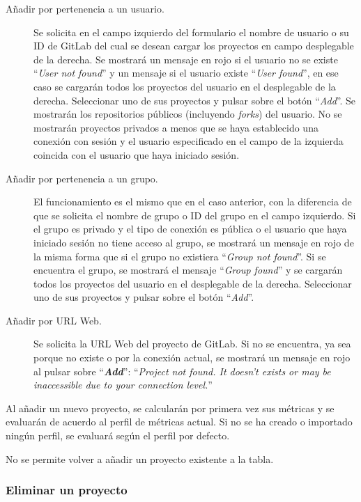 \begin{description}
	\item[Añadir por pertenencia a un usuario.] Se solicita en el campo izquierdo del formulario el nombre de usuario o su ID de GitLab del cual se desean cargar los proyectos en campo desplegable de la derecha. Se mostrará un mensaje en rojo si el usuario no se existe ``\textit{User not found}'' y un mensaje si el usuario existe ``\textit{User found}'', en ese caso se cargarán todos los proyectos del usuario en el desplegable de la derecha. Seleccionar uno de sus proyectos y pulsar sobre el botón ``\textit{Add}''. Se mostrarán los repositorios públicos (incluyendo \textit{forks}) del usuario. No se mostrarán proyectos privados a menos que se haya establecido una conexión con sesión y el usuario especificado en el campo de la izquierda coincida con el usuario que haya iniciado sesión.
	\item[Añadir por pertenencia a un grupo.] El funcionamiento es el mismo que en el caso anterior, con la diferencia de que se solicita el nombre de grupo o ID del grupo en el campo izquierdo. Si el grupo es privado y el tipo de conexión es pública o el usuario que haya iniciado sesión no tiene acceso al grupo, se mostrará un mensaje en rojo de la misma forma que si el grupo no existiera ``\textit{Group not found}''. Si se encuentra el grupo, se mostrará el mensaje ``\textit{Group found}'' y se cargarán todos los proyectos del usuario en el desplegable de la derecha. Seleccionar uno de sus proyectos y pulsar sobre el botón ``\textit{Add}''.
	\item[Añadir por URL Web.] Se solicita la URL Web del proyecto de GitLab. Si no se encuentra, ya sea porque no existe o por la conexión actual, se mostrará un mensaje en rojo al pulsar sobre ``\textbf{\textit{Add}}'': ``\textit{Project not found. It doesn't exists or may be inaccessible due to your connection level.}''
\end{description}

Al añadir un nuevo proyecto, se calcularán por primera vez sus métricas y se evaluarán de acuerdo al perfil de métricas actual. Si no se ha creado o importado ningún perfil, se evaluará según el perfil por defecto.

No se permite volver a añadir un proyecto existente a la tabla.

\subsubsection{Eliminar un proyecto}

